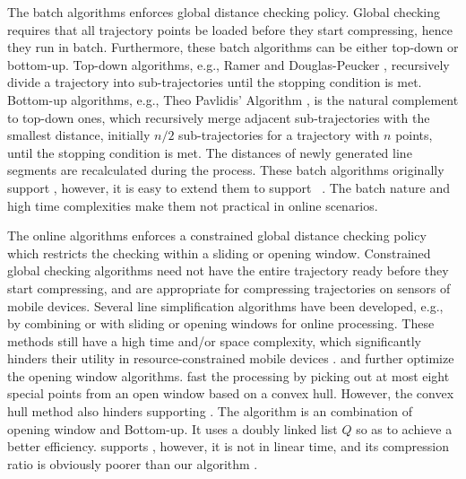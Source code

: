 The batch algorithms enforces global distance checking policy.
Global checking requires that all trajectory points be loaded before they start compressing, hence they run in batch.
Furthermore, these batch algorithms can be either top-down or bottom-up.
Top-down algorithms, e.g., Ramer \cite{Ramer:Split} and Douglas-Peucker \cite{Douglas:Peucker}, recursively divide a trajectory into sub-trajectories until the stopping condition is met.
%
Bottom-up algorithms, e.g., Theo Pavlidis' Algorithm \cite{Pavlidis:Segment}, is the natural complement to top-down ones, which recursively merge adjacent sub-trajectories with the smallest distance, initially $n/2$  sub-trajectories for a trajectory with $n$ points, until the stopping condition is met.
%
The distances of newly generated line segments are recalculated during the process.
%
These batch algorithms originally support \ped, however, it is easy to extend them to support \sed~\cite{Meratnia:Spatiotemporal}.
%
The batch nature and high time complexities make them not practical in online scenarios.


The online algorithms enforces a constrained global distance checking policy which restricts the checking within a sliding or opening window.
Constrained global checking algorithms need not have the entire trajectory ready before they start compressing, and are appropriate for compressing trajectories on sensors of mobile devices.
Several line simplification algorithms have been developed, e.g., by combining \dpa or \pavlidis with sliding or opening windows for online processing\cite{Meratnia:Spatiotemporal}. %
These methods still have a high time and/or space complexity, which significantly hinders their utility in resource-constrained mobile devices \cite{Liu:BQS}.
%
\bqsa \cite{Liu:BQS} and \squishe\cite{Muckell:Compression} further optimize the opening window algorithms.
%
\bqsa \cite{Liu:BQS} fast the processing by picking out at most eight special points from an open window based on a convex hull. However, the convex hull method also hinders \bqsa supporting \sed.
The \squishe\cite{Muckell:Compression} algorithm is an combination of {opening} window and Bottom-up. It uses a doubly linked list $Q$ so as to achieve a better efficiency. \squishe supports \sed, however, it is not in linear time, and its compression ratio is obviously poorer than our algorithm \cist.

